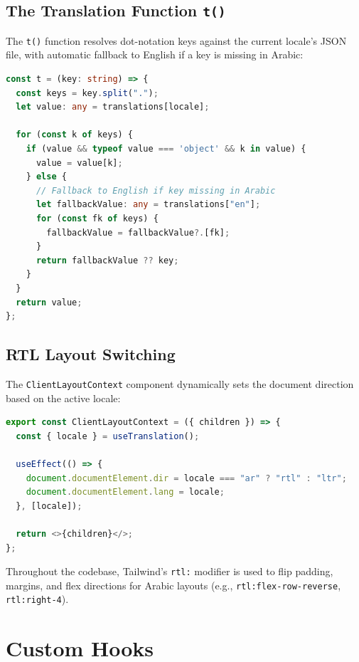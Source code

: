 \documentclass[12pt,a4paper]{article}
\begin{document}
\subsection{The Translation Function \texttt{t()}}

The \texttt{t()} function resolves dot-notation keys against the current locale's JSON file, with automatic fallback to English if a key is missing in Arabic:

\begin{lstlisting}[language=TypeScript,title={LanguageContext.tsx — Translation resolver (key logic)}]
const t = (key: string) => {
  const keys = key.split(".");
  let value: any = translations[locale];

  for (const k of keys) {
    if (value && typeof value === 'object' && k in value) {
      value = value[k];
    } else {
      // Fallback to English if key missing in Arabic
      let fallbackValue: any = translations["en"];
      for (const fk of keys) {
        fallbackValue = fallbackValue?.[fk];
      }
      return fallbackValue ?? key;
    }
  }
  return value;
};
\end{lstlisting}

\subsection{RTL Layout Switching}

The \texttt{ClientLayoutContext} component dynamically sets the document direction based on the active locale:

\begin{lstlisting}[language=TypeScript,title={ClientLayoutContext.tsx — RTL toggle}]
export const ClientLayoutContext = ({ children }) => {
  const { locale } = useTranslation();

  useEffect(() => {
    document.documentElement.dir = locale === "ar" ? "rtl" : "ltr";
    document.documentElement.lang = locale;
  }, [locale]);

  return <>{children}</>;
};
\end{lstlisting}

Throughout the codebase, Tailwind's \texttt{rtl:} modifier is used to flip padding, margins, and flex directions for Arabic layouts (e.g., \texttt{rtl:flex-row-reverse}, \texttt{rtl:right-4}).

\section{Custom Hooks}
\end{document}
